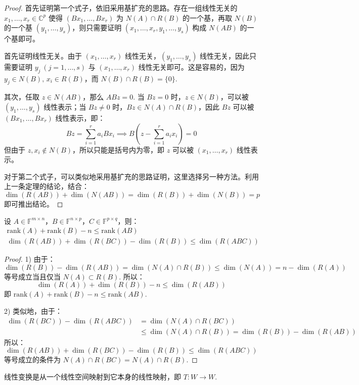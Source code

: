 \begin{proof}
首先证明第一个式子，依旧采用基扩充的思路。存在一组线性无关的 $x_1,\ldots,x_r\in\mathbb C^p$ 使得 $(Bx_1,\ldots,Bx_r)$ 为 $N(A)\cap R(B)$ 的一个基，再取 $N(B)$ 的一个基 $(y_1,\ldots,y_s)$，则只需要证明 $(x_1,\ldots,x_r,y_1,\ldots,y_s)$ 构成 $N(AB)$ 的一个基即可。

首先证明线性无关。由于 $(x_1,\ldots,x_r)$ 线性无关，$(y_1,\ldots,y_s)$ 线性无关，因此只需要证明 $y_j\ (j=1,\ldots,s)$ 与 $(x_1,\ldots,x_r)$ 线性无关即可。这是容易的，因为 $y_j\in N(B),\,x_i\in R(B)$，而 $N(B)\cap R(B)=\{0\}$.

其次，任取 $z\in N(AB)$，那么 $ABz=0$.  当 $Bz=0$ 时，$z\in N(B)$，可以被 $(y_1,\ldots,y_s)$ 线性表示；当 $Bz\neq 0$ 时，$Bz\in N(A)\cap R(B)$，因此 $Bz$ 可以被 $(Bx_1,\ldots,Bx_r)$ 线性表示，即：
\[
    Bz=\sum_{i=1}^r a_i Bx_i\implies B\left(z-\sum_{i=1}^ra_ix_i\right)=0
\]
但由于 $z,x_i\notin N(B)$，所以只能是括号内为零，即 $z$ 可以被 $(x_1,\ldots,x_r)$ 线性表示。

对于第二个式子，可以类似地采用基扩充的思路证明，这里选择另一种方法。利用上一条定理的结论，结合：
\[
    \dim(R(AB))+\dim(N(AB))=\dim(R(B))+\dim(N(B))=p
\]
即可推出结论。
\end{proof}

\begin{corollary}
设 $A\in\mathbb F^{m\times n}$，$B\in\mathbb F^{n\times p}$，$C\in\mathbb F^{p\times q}$，则：
\begin{gather*}
    \text{rank}(A)+\text{rank}(B)-n\leq \text{rank}(AB)\\
    \dim(R(AB))+\dim(R(BC))-\dim(R(B))\leq \dim(R(ABC))
\end{gather*}
\end{corollary}
\begin{proof}
1) 由于：
\[
    \dim(R(B))-\dim(R(AB))=\dim(N(A)\cap R(B))\leq\dim(N(A))=n-\dim(R(A))
\]
等号成立当且仅当 $N(A)\subset R(B)$. 所以：
\[
    \dim(R(A))+\dim(R(B))-n\leq\dim(R(AB))
\]
即 $\text{rank}(A)+\text{rank}(B)-n\leq \text{rank}(AB)$.

2) 类似地，由于：
\begin{align*}
    \dim(R(BC))-\dim(R(ABC))&=\dim(N(A)\cap R(BC))\\
    &\leq \dim(N(A)\cap R(B))=\dim(R(B))-\dim(R(AB))
\end{align*}
所以：
\[
    \dim(R(AB))+\dim(R(BC))-\dim(R(B))\leq \dim(R(ABC))
\]
等号成立的条件为 $N(A)\cap R(BC)=N(A)\cap R(B)$.
\end{proof}

\begin{definition}[线性变换]
线性变换是从一个线性空间映射到它本身的线性映射，即 $T:W\to W$.
\end{definition}

